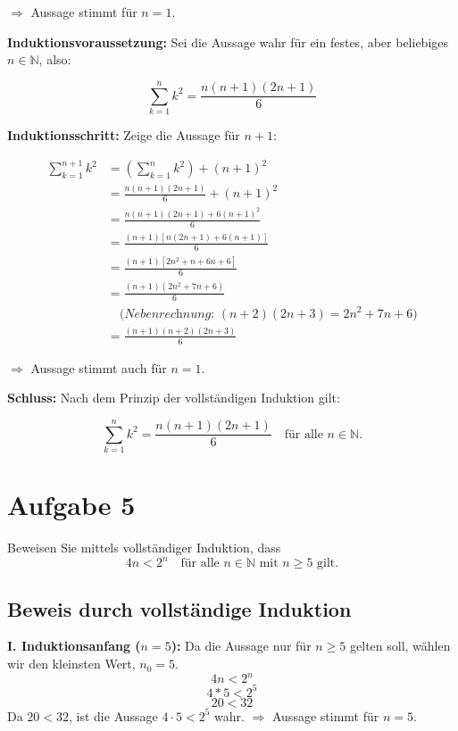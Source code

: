 \documentclass{article}
\begin{document}
\(\Rightarrow\) Aussage stimmt für \( n = 1 \).

\bigskip

\textbf{Induktionsvoraussetzung:} Sei die Aussage wahr für ein festes, aber beliebiges \( n \in \mathbb{N} \), also:

\[
	\sum_{k=1}^{n} k^2 = \frac{n(n+1)(2n+1)}{6}
\]

\textbf{Induktionsschritt:} Zeige die Aussage für \( n+1 \):

\begin{align*}
	\sum_{k=1}^{n+1} k^2
	 & = \left( \sum_{k=1}^{n} k^2 \right) + (n+1)^2                         \\
	 & = \frac{n(n+1)(2n+1)}{6} + (n+1)^2                                    \\
	 & = \frac{n(n+1)(2n+1) + 6(n+1)^2}{6}                                   \\
	 & = \frac{(n+1)\left[n(2n+1) + 6(n+1)\right]}{6}                        \\
	 & = \frac{(n+1)\left[2n^2 + n + 6n + 6\right]}{6}                       \\
	 & = \frac{(n+1)(2n^2 + 7n + 6)}{6}                                      \\
	 & \quad \textit{(Nebenrechnung: } (n+2)(2n+3) = 2n^2 + 7n + 6\textit{)} \\
	 & = \frac{(n+1)(n+2)(2n+3)}{6}
\end{align*}

\(\Rightarrow\) Aussage stimmt auch für \( n = 1 \).

\bigskip

\textbf{Schluss:} Nach dem Prinzip der vollständigen Induktion gilt:

\[
	\sum_{k=1}^{n} k^2 = \frac{n(n+1)(2n+1)}{6} \quad \text{für alle } n \in \mathbb{N}.
\]

\section*{Aufgabe 5}

Beweisen Sie mittels vollständiger Induktion, dass
\[
	4n < 2^n \quad \text{für alle } n \in \mathbb{N} \text{ mit } n \geq 5 \text{ gilt.}
\]


\subsection*{Beweis durch vollständige Induktion}

\textbf{I. Induktionsanfang ($n=5$):}
Da die Aussage nur für $n \geq 5$ gelten soll, wählen wir den kleinsten Wert, $n_0 = 5$.
\[
	4n < 2^n
\]
\[
	4 * 5 < 2^5
\]
\[
	20 < 32
\]
Da $20 < 32$, ist die Aussage $4 \cdot 5 < 2^5$ wahr.
\(\Rightarrow\) Aussage stimmt für \( n = 5 \).
\end{document}
